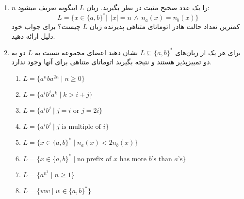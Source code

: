 \documentclass{article}
\begin{document}
\begin{enumerate}
		
		\item 
		$n$
		را یک عدد صحیح مثبت در نظر بگیرید. زبان $L$ اینگونه تعریف میشود:
		$$ L =\{ x \in \{ a,b \}^* | \;\, |x| = n \, \land \, n_a(x) = n_b(x)\}  $$
		کمترین تعداد حالت هادر اتوماتای متناهی پذیرنده زبان $L$ چیست؟
		برای جواب خود دلیل ارائه دهید.
		 \\
		
		\item 
		برای هر یک از زبان‌های
		$L \subseteq \{a, b\}^*$
		نشان دهید اعضای مجموعه 
		نسبت به $L$ دو به دو تمییزپذیر
		هستند و نتیجه بگیرید اتوماتای متناهی 
		برای آنها وجود ندارد.
		\begin{latin}
			\begin{enumerate}
				\item $L = \{a^nba^{2n} \; | \; n \geq 0\}$
				\item $L = \{a^ib^ja^k \; | \; k >  i + j \}$
				\item $L = \{a^ib^j \; | \; \text{$j = i$ or $j = 2i$}\}$
				\item $L = \{a^ib^j \; | \; \text{$j$ is multiple of $i$}\}$
				\item $L = \{x \in \{a,b\}^* \; | \; n_a(x) < 2n_b(x) \}$
				\item $L = \{x \in \{a,b\}^* \; | \; \text{no prefix of $x$ has more $b$'s than $a$'s} \}$
				\item $L = \{a^{n^3} \; | \;  n \geq 1\}$
				\item $L = \{ww \; | \;  w \in \{a,b\}^*\}$
			\end{enumerate}
		\end{latin}
		
	\end{enumerate}
	
	
\end{document}
